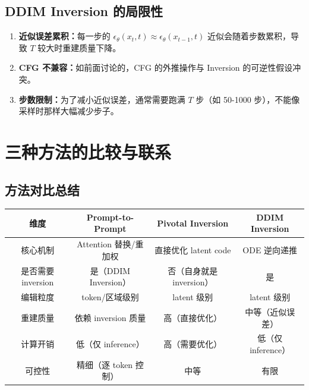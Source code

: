 \documentclass[11pt,a4paper]{article}
\theoremstyle{definition}
\begin{document}
\subsection{DDIM Inversion 的局限性}

\begin{enumerate}
    \item \textbf{近似误差累积：}每一步的 $\epsilon_\theta(x_t, t) \approx \epsilon_\theta(x_{t-1}, t)$ 近似会随着步数累积，导致 $T$ 较大时重建质量下降。
    \item \textbf{CFG 不兼容：}如前面讨论的，CFG 的外推操作与 Inversion 的可逆性假设冲突。
    \item \textbf{步数限制：}为了减小近似误差，通常需要跑满 $T$ 步（如 50-1000 步），不能像采样时那样大幅减少步子。
\end{enumerate}


\section{三种方法的比较与联系}

\subsection{方法对比总结}

\begin{center}
\begin{tabular}{c|c|c|c}
    \toprule
    \textbf{维度} & \textbf{Prompt-to-Prompt} & \textbf{Pivotal Inversion} & \textbf{DDIM Inversion} \\
    \midrule
    核心机制 & Attention 替换/重加权 & 直接优化 latent code & ODE 逆向递推 \\
    是否需要 inversion & 是（DDIM Inversion） & 否（自身就是 inversion） & 是 \\
    编辑粒度 & token/区域级别 & latent 级别 & latent 级别 \\
    重建质量 & 依赖 inversion 质量 & 高（直接优化） & 中等（近似误差） \\
    计算开销 & 低（仅 inference） & 高（需要优化） & 低（仅 inference） \\
    可控性 & 精细（逐 token 控制） & 中等 & 有限 \\
    \bottomrule
\end{tabular}
\end{center}
\end{document}
